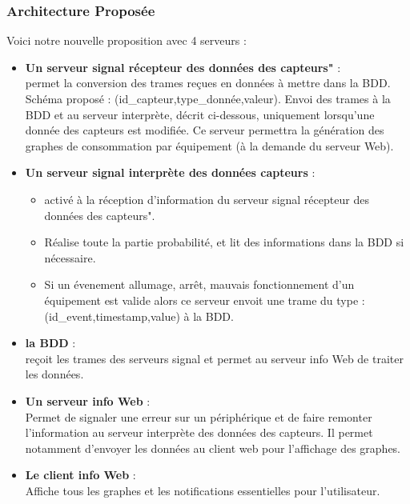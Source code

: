 \documentclass[10pt,a4paper]{article}
\begin{document}
\subsubsection{Architecture Proposée}
Voici notre nouvelle proposition avec 4 serveurs :
\begin{itemize}
  \item \textbf{Un serveur signal récepteur des données des capteurs"} :\\
  permet la conversion des trames reçues en données à mettre dans la BDD. Schéma proposé : (id\_capteur,type\_donnée,valeur). Envoi des trames à la BDD et au serveur interprète, décrit ci-dessous, uniquement lorsqu'une donnée des capteurs est modifiée. Ce serveur permettra la génération des graphes de consommation par équipement (à la demande du serveur Web).
  \item \textbf{Un serveur signal interprète des données capteurs} :
  \begin{itemize}
    \item  activé à la réception d'information du serveur signal récepteur des données des capteurs".
    \item Réalise toute la partie probabilité, et lit des informations dans la BDD si nécessaire.
    \item Si un évenement allumage, arrêt, mauvais fonctionnement d'un équipement est valide alors ce serveur envoit une trame du type : (id\_event,timestamp,value) à la BDD.
  \end{itemize}
  \item \textbf{la BDD} : \\
  reçoit les trames des serveurs signal et permet au serveur info Web de traiter les données.
  \item \textbf{Un serveur info Web} :\\
  Permet de signaler une erreur sur un périphérique et de faire remonter l'information au serveur interprète des données des capteurs. Il permet notamment d'envoyer les données au client web pour l'affichage des graphes.
  \item \textbf{Le client info Web} :\\
  Affiche tous les graphes et les notifications essentielles pour l'utilisateur.
\end{itemize}
\end{document}
